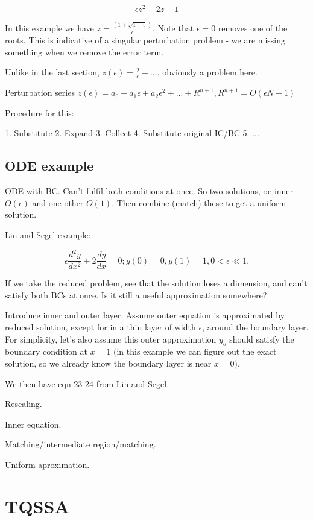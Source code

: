 \documentclass[12pt]{report}
\begin{document}
\begin{equation}
  \epsilon z^2 - 2z + 1
\end{equation}

In this example we have $z = \frac{(1 \pm \sqrt{1-\epsilon})}{\epsilon}$. Note
that $\epsilon=0$ removes one of the roots. This is indicative of a singular
perturbation problem - we are missing something when we remove the error term.

Unlike in the last section, $z(\epsilon) = \frac 2 \epsilon + ...$, obviously a
problem here.

Perturbation series $z(\epsilon) = a_0 + a_1 \epsilon + a_2 \epsilon^2 + ... +
R^{n+1}, R^{n+1} = O(\epsilon{N+1})$

Procedure for this:

1. Substitute
2. Expand
3. Collect
4. Substitute original IC/BC
5. ...

\section{ODE example}

ODE with BC. Can't fulfil both conditions at once. So two solutions, oe inner
$O(\epsilon)$ and one other $O(1)$. Then combine (match) these to get a uniform
solution.

Lin and Segel example:

$$\epsilon \frac{d^2 y}{d x^2} + 2 \frac{dy}{dx} = 0; y(0)=0, y(1)=1, 0 <
\epsilon \ll 1.$$

If we take the reduced problem, see that the solution loses a dimension, and
can't satisfy both BCs at once. Is it still a useful approximation somewhere?

Introduce inner and outer layer. Assume outer equation is approximated by
reduced solution, except for in a thin layer of width $\epsilon$, around the
boundary layer. For simplicity, let's also assume this outer approximation
$y_o$ should satisfy the boundary condition at $x=1$ (in this example we can
figure out the exact solution, so we already know the boundary layer is near
$x=0$).

We then have eqn 23-24 from Lin and Segel.

Rescaling.

Inner equation.

Matching/intermediate region/matching.

Uniform aproximation.

\chapter{TQSSA}
\end{document}
